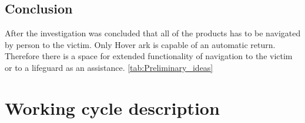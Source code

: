 \subsection{Conclusion}
After the investigation was concluded that all of the products has to be navigated by person to the victim. 
Only Hover ark is capable of an automatic return. Therefore there is a space for extended functionality of navigation to the victim or to a lifeguard as an assistance. 
\ref{tab:Preliminary_ideas}

\section{Working cycle description}


